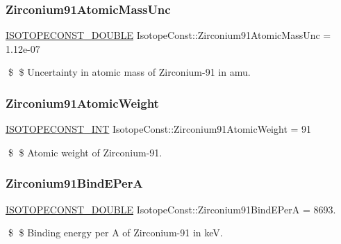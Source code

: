 \subsubsection{\texorpdfstring{Zirconium91\+Atomic\+Mass\+Unc}{Zirconium91AtomicMassUnc}}
{\footnotesize\ttfamily \mbox{\hyperlink{group___isotope_const-_macros_ga8f45a7272ce02c0b4c65c44636ed719a}{I\+S\+O\+T\+O\+P\+E\+C\+O\+N\+S\+T\+\_\+\+D\+O\+U\+B\+LE}} Isotope\+Const\+::\+Zirconium91\+Atomic\+Mass\+Unc = 1.\+12e-\/07}

\$ \$ Uncertainty in atomic mass of Zirconium-\/91 in amu. \mbox{\label{group___isotope_const-_zirconium-_zr91_gaba6546f61a435aea51ebfd53f49c1f2a}} 
\subsubsection{\texorpdfstring{Zirconium91\+Atomic\+Weight}{Zirconium91AtomicWeight}}
{\footnotesize\ttfamily \mbox{\hyperlink{group___isotope_const-_macros_ga5f18360b3e99483a35c32d789e62621c}{I\+S\+O\+T\+O\+P\+E\+C\+O\+N\+S\+T\+\_\+\+I\+NT}} Isotope\+Const\+::\+Zirconium91\+Atomic\+Weight = 91}

\$ \$ Atomic weight of Zirconium-\/91. \mbox{\label{group___isotope_const-_zirconium-_zr91_ga5ffd2d5e1a2427b86c44445b006300bc}} 
\subsubsection{\texorpdfstring{Zirconium91\+Bind\+E\+PerA}{Zirconium91BindEPerA}}
{\footnotesize\ttfamily \mbox{\hyperlink{group___isotope_const-_macros_ga8f45a7272ce02c0b4c65c44636ed719a}{I\+S\+O\+T\+O\+P\+E\+C\+O\+N\+S\+T\+\_\+\+D\+O\+U\+B\+LE}} Isotope\+Const\+::\+Zirconium91\+Bind\+E\+PerA = 8693.}

\$ \$ Binding energy per A of Zirconium-\/91 in keV. \mbox{\label{group___isotope_const-_zirconium-_zr91_ga820c524e3ae94ef5cc054ab12f1c2c07}} 
